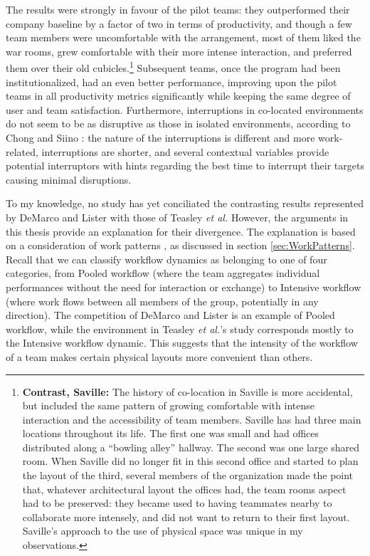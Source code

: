 The results were strongly in favour of the pilot teams: they outperformed their company baseline by a factor of two in terms of productivity, and though a few team members were uncomfortable with the arrangement, most of them liked the war rooms, grew comfortable with their more intense interaction, and preferred them over their old cubicles.\footnote{\textbf{Contrast, Saville:} The history of co-location in Saville is more accidental, but included the same pattern of growing comfortable with intense interaction and the accessibility of team members. Saville has had three main locations throughout its life. The first one was small and had offices distributed along a ``bowling alley'' hallway. The second was one large shared room. When Saville did no longer fit in this second office and started to plan the layout of the third, several members of the organization made the point that, whatever architectural layout the offices had, the team rooms aspect had to be preserved: they became used to having teammates nearby to collaborate more intensely, and did not want to return to their first layout. Saville's approach to the use of physical space was unique in my observations.} Subsequent teams, once the program had been institutionalized, had an even better performance, improving upon the pilot teams in all productivity metrics significantly while keeping the same degree of user and team satisfaction. Furthermore, interruptions in co-located environments do not seem to be as disruptive as those in isolated environments, according to Chong and Siino : the nature of the interruptions is different and more work-related, interruptions are shorter, and several contextual variables provide potential interruptors with hints regarding the best time to interrupt their targets causing minimal disruptions.

To my knowledge, no study has yet conciliated the contrasting results represented by DeMarco and Lister with those of Teasley \emph{et al.} However, the arguments in this thesis provide an explanation for their divergence. The explanation is based on a consideration of work patterns \cite{Tesluk1997}, as discussed in section \ref{sec:WorkPatterns}. Recall that we can classify workflow dynamics as belonging to one of four categories, from Pooled workflow (where the team aggregates individual performances without the need for interaction or exchange) to Intensive workflow (where work flows between all members of the group, potentially in any direction). The competition of DeMarco and Lister is an example of Pooled workflow, while the environment in Teasley \emph{et al.}'s study corresponds mostly to the Intensive workflow dynamic. This suggests that the intensity of the workflow of a team makes certain physical layouts more convenient than others.

